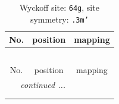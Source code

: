 \documentclass[fleqn,8pt]{jsarticle}
\begin{document}
\renewcommand{\arraystretch}{1.2}
\begin{longtable}{ccc}
\caption{Wyckoff site: {\tt 64g}, site symmetry: {\tt .3m'}}
 \\
 \hline \hline
No. & position & mapping \\ \hline \endfirsthead

\multicolumn{2}{l}{\tablename\ \thetable{}} \\
 \hline \hline
No. & position & mapping \\ \hline \endhead

 \hline \hline
\multicolumn{2}{r}{\footnotesize\it continued ...} \\ \endfoot

 \hline \hline
\multicolumn{2}{r}{} \\ \endlastfoot


\end{longtable}
\end{document}
